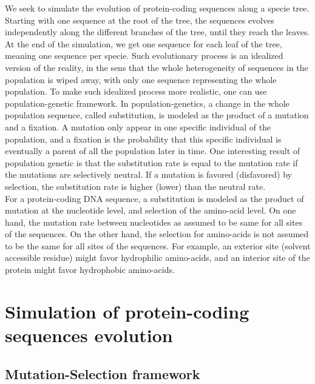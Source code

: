 \documentclass{article}
\begin{document}
    We seek to simulate the evolution of protein-coding sequences along a specie tree.
    Starting with one sequence at the root of the tree, the sequences evolves independently along the different branches of the tree, until they reach the leaves. At the end of the simulation, we get one sequence for each leaf of the tree, meaning one sequence per specie.
    Such evolutionary process is an idealized version of the reality, in the sens that the whole heterogeneity of sequences in the population is wiped away, with only one sequence representing the whole population. To make such idealized process more realistic, one can use population-genetic framework. In population-genetics, a change in the whole population sequence, called substitution, is modeled as the product of a mutation and a fixation. A mutation only appear in one specific individual of the population, and a fixation is the probability that this specific individual is eventually a parent of all the population later in time. One interesting result of population genetic is that the substitution rate is equal to the mutation rate if the mutations are selectively neutral. If a mutation is favored (disfavored) by selection, the substitution rate is higher (lower) than the neutral rate.\\

    For a protein-coding DNA sequence, a substitution is modeled as the product of mutation at the nucleotide level, and selection of the amino-acid level. On one hand, the mutation rate between nucleotides as assumed to be same for all sites of the sequences. On the other hand, the selection for amino-acids is not assumed to be the same for all sites of the sequences. For example, an exterior site (solvent accessible residue) might favor hydrophilic amino-acids, and an interior site of the protein might favor hydrophobic amino-acids.

    \section{Simulation of protein-coding sequences evolution}

    \subsection{Mutation-Selection framework}
\end{document}
